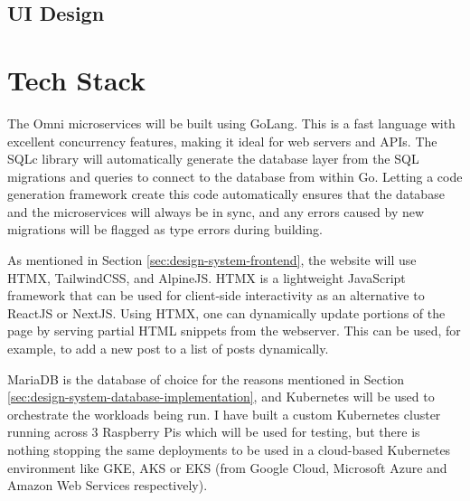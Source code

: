 \subsection{UI Design}
\label{sec:design-ui}

\section{Tech Stack}
\label{sec:design-review}
The Omni microservices will be built using GoLang. This is a fast language with excellent concurrency features, making it ideal for web servers and APIs.
The SQLc library will automatically generate the database layer from the SQL migrations and queries to connect to the database from within Go.
Letting a code generation framework create this code automatically ensures that the database and the microservices will always be in sync, and any errors caused by new migrations will be flagged as type errors during building. 

As mentioned in Section \ref{sec:design-system-frontend}, the website will use HTMX, TailwindCSS, and AlpineJS. HTMX is a lightweight JavaScript framework that can be used for client-side interactivity as an alternative to ReactJS or NextJS.
Using HTMX, one can dynamically update portions of the page by serving partial HTML snippets from the webserver. This can be used, for example, to add a new post to a list of posts dynamically.

MariaDB is the database of choice for the reasons mentioned in Section \ref{sec:design-system-database-implementation}, and Kubernetes will be used to orchestrate the workloads being run. I have built a custom Kubernetes cluster running across 3 Raspberry Pis which will be used for testing, but there is nothing stopping the same deployments to be used in a cloud-based Kubernetes environment like GKE, AKS or EKS (from Google Cloud, Microsoft Azure and Amazon Web Services respectively).
